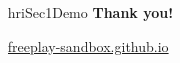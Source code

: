 \documentclass[compress]{beamer}
\begin{document}
{
\begin{frame}[plain]

    \begin{columns}
        \begin{column}{0.5\linewidth}
        \end{column}
        \begin{column}{0.5\linewidth}

    \vspace{7cm}
\begin{beamercolorbox}[wd=\linewidth,ht=6ex,dp=0.7ex]{hriSec1Demo}
    \textbf{Thank you!}

    \vspace{2em}
    \href{https://freeplay-sandbox.github.io}{freeplay-sandbox.github.io}
\end{beamercolorbox}
        \end{column}
    \end{columns}
\end{frame}
}
\end{document}

